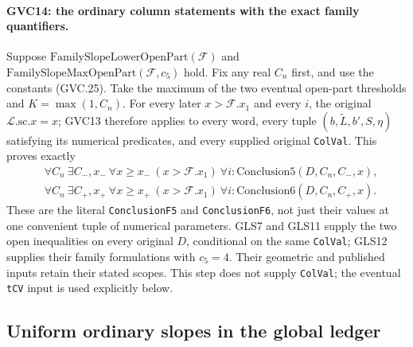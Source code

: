 \paragraph{GVC14: the ordinary column statements with the exact family quantifiers.}
\label{claim:GVC14}
Suppose
$\mathrm{FamilySlopeLowerOpenPart}(\mathcal F)$ and
$\mathrm{FamilySlopeMaxOpenPart}(\mathcal F,c_5)$ hold.
Fix any real $C_n$ first, and use the constants (GVC.25).
Take the maximum of the two eventual open-part thresholds and
$K=\max(1,C_n)$. For every later $x>\mathcal F.x_1$ and every
$i$, the original $\mathcal L.\mathrm{sc}.x=x$;
GVC13 therefore applies to every word, every tuple
$(b,\widetilde L,b',S,\eta)$ satisfying its numerical predicates,
and every supplied original \texttt{ColVal}.
This proves exactly
\[
 \begin{split}
 &\forall C_n\ \exists C_-,x_-\ \forall x\ge x_-\
   (x>\mathcal F.x_1)\ \forall i:
             \mathrm{Conclusion5}(D,C_n,C_-,x),\\
 &\forall C_n\ \exists C_+,x_+\ \forall x\ge x_+\
   (x>\mathcal F.x_1)\ \forall i:
             \mathrm{Conclusion6}(D,C_n,C_+,x).
 \end{split}                                                 \tag{GVC.28}
\]
These are the literal \texttt{ConclusionF5} and
\texttt{ConclusionF6}, not just their values at one convenient
tuple of numerical parameters.
GLS7 and GLS11 supply the two open inequalities on every original
$D$, conditional on the same \texttt{ColVal}; GLS12 supplies
their family formulations with $c_5=4$.
Their geometric and published inputs retain their stated scopes.
This step does not supply \texttt{ColVal}; the eventual
\texttt{tCV} input is used explicitly below.

\subsection{Uniform ordinary slopes in the global ledger}

